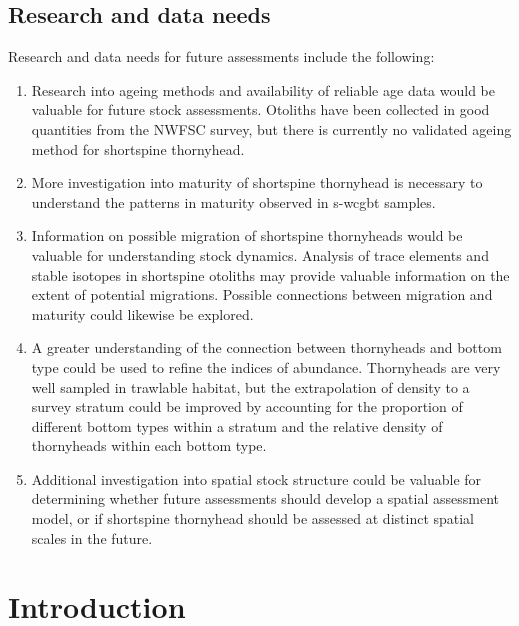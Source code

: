 \documentclass[11pt,
  english,
  letterpaper,
]{article}
\providecommand{\tightlist}{%
  \setlength{\itemsep}{0pt}\setlength{\parskip}{0pt}}
\providecommand{\tightlist}{%
  \setlength{\itemsep}{0pt}\setlength{\parskip}{0pt}}
\begin{document}
\hypertarget{research-and-data-needs}{%
\subsection*{Research and data needs}\label{research-and-data-needs}}

Research and data needs for future assessments include the following:

\begin{enumerate}
\def\labelenumi{\arabic{enumi}.}
\tightlist
\item
  Research into ageing methods and availability of reliable age data would be valuable for future stock assessments. Otoliths have been collected in good quantities from the NWFSC survey, but there is currently no validated ageing method for shortspine thornyhead.
\item
  More investigation into maturity of shortspine thornyhead is necessary to understand the patterns in maturity observed in \gls{s-wcgbt} samples.
\item
  Information on possible migration of shortspine thornyheads would be valuable for understanding stock dynamics. Analysis of trace elements and stable isotopes in shortspine otoliths may provide valuable information on the extent of potential migrations. Possible connections between migration and maturity could likewise be explored.
\item
  A greater understanding of the connection between thornyheads and bottom type could be used to refine the indices of abundance. Thornyheads are very well sampled in trawlable habitat, but the extrapolation of density to a survey stratum could be improved by accounting for the proportion of different bottom types within a stratum and the relative density of thornyheads within each bottom type.
\item
  Additional investigation into spatial stock structure could be valuable for determining whether future assessments should develop a spatial assessment model, or if shortspine thornyhead should be assessed at distinct spatial scales in the future.
\end{enumerate}

\pagebreak
\setlength{\parskip}{5mm plus1mm minus1mm}
\setcounter{page}{1}
\renewcommand{\thefigure}{\arabic{figure}}
\renewcommand{\thetable}{\arabic{table}}
\setcounter{table}{0}
\setcounter{figure}{0}

\hypertarget{introduction}{%
\section{Introduction}\label{introduction}}
\end{document}
